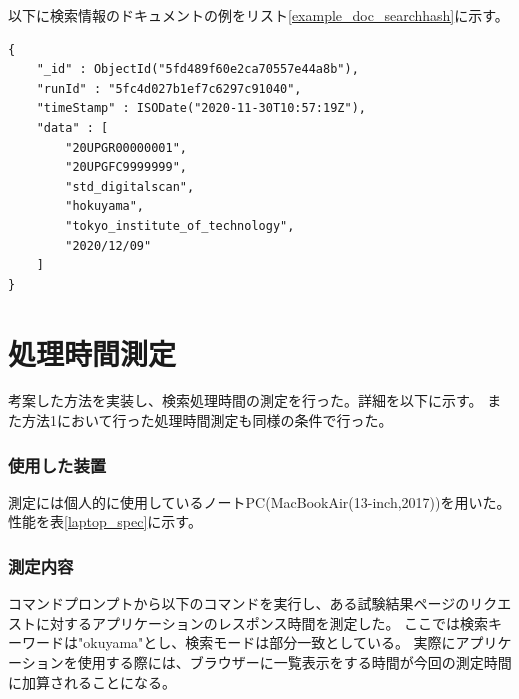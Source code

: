 \newpage
以下に検索情報のドキュメントの例をリスト\ref{example_doc_searchhash}に示す。
\begin{lstlisting}[basicstyle=\scriptsize,caption=検索情報コレクションに入るドキュメントの例。このように試験結果のID、試験日時、検索対象となる名前情報が保存される。,label=example_doc_searchhash]
{
	"_id" : ObjectId("5fd489f60e2ca70557e44a8b"),
	"runId" : "5fc4d027b1ef7c6297c91040",
	"timeStamp" : ISODate("2020-11-30T10:57:19Z"),
	"data" : [
		"20UPGR00000001",
		"20UPGFC9999999",
		"std_digitalscan",
		"hokuyama",
		"tokyo_institute_of_technology",
		"2020/12/09"
	]
}
\end{lstlisting}

\section{処理時間測定} \label{sec:search_process_time_mes}

考案した方法を実装し、検索処理時間の測定を行った。詳細を以下に示す。
また方法1において行った処理時間測定も同様の条件で行った。

\subsubsection{使用した装置}

測定には個人的に使用しているノートPC(MacBookAir(13-inch,2017))を用いた。
性能を表\ref{laptop_spec}に示す。

\begin{table}[tbp]
\caption[測定に使用したノートPCの性能]{測定に使用したノートPC(MacBookAir(13-inch,2017))の性能。検索処理時間の測定に個人的に使用しているノートPCを使用した。}
\label{laptop_spec}
\end{table}


\subsubsection{測定内容}

コマンドプロンプトから以下のコマンドを実行し、ある試験結果ページのリクエストに対するアプリケーションのレスポンス時間を測定した。
ここでは検索キーワードは"okuyama"とし、検索モードは部分一致としている。
実際にアプリケーションを使用する際には、ブラウザーに一覧表示をする時間が今回の測定時間に加算されることになる。


